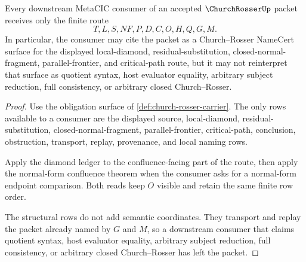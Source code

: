 \begin{theorem}
\label{thm:church-rosser-metacic-route-boundary}
Every downstream MetaCIC consumer of an accepted $\ChurchRosserUp$ packet receives only the finite route
$$
T,L,S,NF,P,D,C,O,H,Q,G,M .
$$
In particular, the consumer may cite the packet as a Church--Rosser NameCert surface for the displayed local-diamond, residual-substitution, closed-normal-fragment, parallel-frontier, and critical-path route, but it may not reinterpret that surface as quotient syntax, host evaluator equality, arbitrary subject reduction, full consistency, or arbitrary closed Church--Rosser.
\end{theorem}
\begin{proof}
Use the obligation surface of \autoref{def:church-rosser-carrier}. The only rows available to a consumer are the displayed source, local-diamond, residual-substitution, closed-normal-fragment, parallel-frontier, critical-path, conclusion, obstruction, transport, replay, provenance, and local naming rows.

Apply the diamond ledger to the confluence-facing part of the route, then apply the normal-form confluence theorem when the consumer asks for a normal-form endpoint comparison. Both reads keep $O$ visible and retain the same finite row order.

The structural rows do not add semantic coordinates. They transport and replay the packet already named by $G$ and $M$, so a downstream consumer that claims quotient syntax, host evaluator equality, arbitrary subject reduction, full consistency, or arbitrary closed Church--Rosser has left the packet.
\end{proof}



